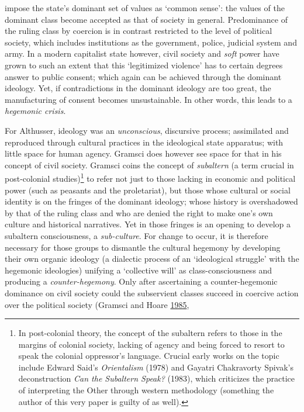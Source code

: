 \documentclass[10pt,british,A4paper,twoside]{memoir}
\begin{document}
impose the state's dominant set of values as `common sense': the values
of the dominant class become accepted as that of society in general.
Predominance of the ruling class by coercion is in contrast restricted
to the level of political society, which includes institutions as the
government, police, judicial system and army. In a modern capitalist
state however, civil society and \emph{soft} power have grown to such an
extent that this `legitimized violence' has to certain degrees answer to
public consent; which again can be achieved through the dominant
ideology. Yet, if contradictions in the dominant ideology are too great,
the manufacturing of consent becomes unsustainable. In other words, this
leads to a \emph{hegemonic crisis}.

For Althusser, ideology was an \emph{unconscious}, discursive process;
assimilated and reproduced through cultural practices in the ideological
state apparatus; with little space for human agency. Gramsci does
however see space for that in his concept of civil society. Gramsci
coins the concept of \emph{subaltern} (a term crucial in post-colonial
studies)\footnote{In post-colonial theory, the concept of the subaltern
  refers to those in the margins of colonial society, lacking of agency
  and being forced to resort to speak the colonial oppressor's language.
  Crucial early works on the topic include Edward Said's
  \emph{Orientalism} (1978) and Gayatri Chakravorty Spivak's
  deconstruction \emph{Can the Subaltern Speak?} (1983), which
  criticizes the practice of interpreting the Other through western
  methodology (something the author of this very paper is guilty of as
  well).} to refer not just to those lacking in economic and political
power (such as peasants and the proletariat), but those whose cultural
or social identity is on the fringes of the dominant ideology; whose
history is overshadowed by that of the ruling class and who are denied
the right to make one's own culture and historical narratives. Yet in
those fringes is an opening to develop a subaltern consciousness, a
\emph{sub-culture}. For change to occur, it is therefore necessary for
those groups to dismantle the cultural hegemony by developing their own
organic ideology (a dialectic process of an `ideological struggle' with
the hegemonic ideologies) unifying a `collective will' as
class-consciousness and producing a \emph{counter-hegemony}. Only after
ascertaining a counter-hegemonic dominance on civil society could the
subservient classes succeed in coercive action over the political
society (Gramsci and Hoare
\protect\hyperlink{ref-gramsci_selections_1985}{1985},
\end{document}
